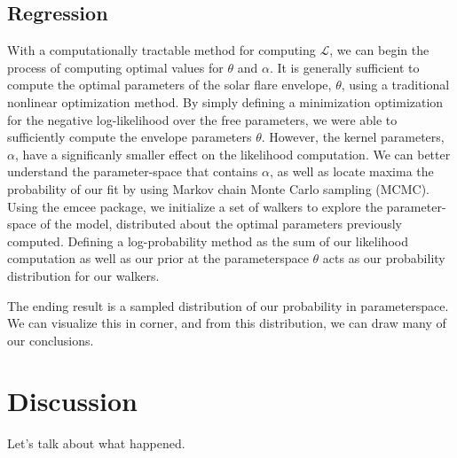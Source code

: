 \documentclass{aastex61}
\begin{document}
\subsection{Regression}
With a computationally tractable method for computing $\mathcal{L}$, we can begin the process of computing optimal values for $\theta$ and $\alpha$.
It is generally sufficient to compute the optimal parameters of the solar flare envelope, $\theta$, using a traditional nonlinear optimization method. By simply defining a minimization optimization for the negative log-likelihood over the free parameters, we were able to sufficiently compute the envelope parameters $\theta$.
However, the kernel parameters, $\alpha$, have a significanly smaller effect on the likelihood computation. 
We can better understand the parameter-space that contains $\alpha$, as well as locate maxima the probability of our fit by using Markov chain Monte Carlo sampling (MCMC).
Using the emcee package, we initialize a set of walkers to explore the parameter-space of the model, distributed about the optimal parameters previously computed. Defining a log-probability method as the sum of our likelihood computation as well as our prior at the parameterspace $\theta$ acts as our probability distribution for our walkers.

The ending result is a sampled distribution of our probability in parameterspace. We can visualize this in corner, and from this distribution, we can draw many of our conclusions.

\section{Discussion} \label{sec:discussion}
Let's talk about what happened.






\end{document}

